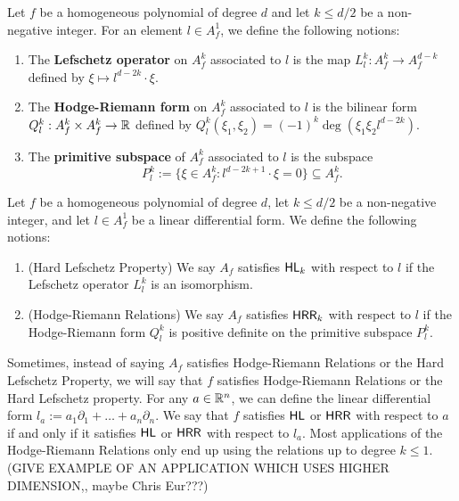 \documentclass{puthesis-UG}
\begin{document}
\begin{defn}
	Let $f$ be a homogeneous polynomial of degree $d$ and let $k \leq d/2$ be a non-negative integer. For an element $l \in A_f^1$, we define the following notions:
	\begin{enumerate}[label = (\alph*)]
		\item The \textbf{Lefschetz operator} on $A_f^k$ associated to $l$ is the map $L_l^k : A_f^k \to A_f^{d-k}$ defined by $\xi \mapsto l^{d-2k} \cdot \xi$. 

		\item The \textbf{Hodge-Riemann form} on $A_f^k$ associated to $l$ is the bilinear form $Q_l^k : A_f^k \times A_f^k \to \mathbb{R}$ defined by $Q_l^k (\xi_1, \xi_2) = (-1)^k \deg (\xi_1 \xi_2 l^{d-2k})$.

		\item The \textbf{primitive subspace} of $A_f^k$ associated to $l$ is the subspace
		\[
			P_l^k := \{\xi \in A_f^k : l^{d-2k+1} \cdot \xi = 0\} \subseteq A_f^k.
		\]
	\end{enumerate}
\end{defn}

\begin{defn}
	Let $f$ be a homogeneous polynomial of degree $d$, let $k \leq d/2$ be a non-negative integer, and let $l \in A_f^1$ be a linear differential form. We define the following notions:
	\begin{enumerate}[label = (\alph*)]
		\item (Hard Lefschetz Property) We say $A_f$ satisfies $\mathsf{HL}_k$ with respect to $l$ if the Lefschetz operator $L_l^k$ is an isomorphism.

		\item (Hodge-Riemann Relations) We say $A_f$ satisfies $\mathsf{HRR}_k$ with respect to $l$ if the Hodge-Riemann form $Q_l^k$ is positive definite on the primitive subspace $P_l^k$. 
	\end{enumerate}
\end{defn}

Sometimes, instead of saying $A_f$ satisfies Hodge-Riemann Relations or the Hard Lefschetz Property, we will say that $f$ satisfies Hodge-Riemann Relations or the Hard Lefschetz property. For any $a \in \mathbb{R}^n$, we can define the linear differential form $l_a := a_1 \partial_1 + \ldots + a_n \partial_n$. We say that $f$ satisfies $\mathsf{HL}$ or $\mathsf{HRR}$ with respect to $a$ if and only if it satisfies $\mathsf{HL}$ or $\mathsf{HRR}$ with respect to $l_a$. Most applications of the Hodge-Riemann Relations only end up using the relations up to degree $k \leq 1$. (GIVE EXAMPLE OF AN APPLICATION WHICH USES HIGHER DIMENSION,, maybe Chris Eur???) 
\end{document}

